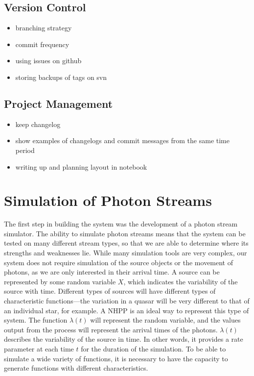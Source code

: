 \documentclass[a4paper,11pt]{article}
\begin{document}
\subsection{Version Control}
\label{sec-4-4}

\begin{itemize}
\item branching strategy
\item commit frequency
\item using issues on github
\item storing backups of tags on svn
\end{itemize}
\subsection{Project Management}
\label{sec-4-5}

\begin{itemize}
\item keep changelog
\item show examples of changelogs and commit messages from the same time period
\item writing up and planning layout in notebook
\end{itemize}
\section{Simulation of Photon Streams}
\label{sec-5}

The first step in building the system was the development of a photon stream
simulator. The ability to simulate photon streams means that the system can be
tested on many different stream types, so that we are able to determine where
its strengths and weaknesses lie. While many simulation tools are very complex,
our system does not require simulation of the source objects or the movement of
photons, as we are only interested in their arrival time. A source can be
represented by some random variable $X$, which indicates the variability of the
source with time. Different types of sources will have different types of
characteristic functions---the variation in a quasar will be very different to
that of an individual star, for example. A NHPP is an ideal way to represent
this type of system. The function $\lambda(t)$ will represent the random
variable, and the values output from the process will represent the arrival
times of the photons. $\lambda(t)$ describes the variability of the source in
time. In other words, it provides a rate parameter at each time $t$ for the
duration of the simulation. To be able to simulate a wide variety of functions,
it is necessary to have the capacity to generate functions with different
characteristics.
\end{document}
